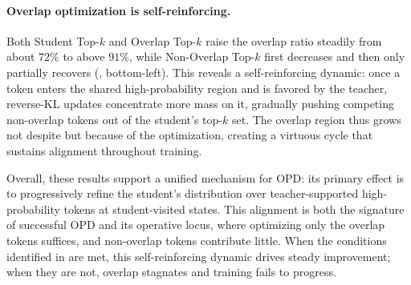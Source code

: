 \paragraph{Overlap optimization is self-reinforcing.}
Both Student Top-$k$ and Overlap Top-$k$ raise the overlap ratio steadily from about $72\%$ to above $91\%$, while Non-Overlap Top-$k$ first decreases and then only partially recovers (, bottom-left).
This reveals a self-reinforcing dynamic: once a token enters the shared high-probability region and is favored by the teacher, reverse-KL updates concentrate more mass on it, gradually pushing competing non-overlap tokens out of the student's top-$k$ set. The overlap region thus grows not despite but because of the optimization, creating a virtuous cycle that sustains alignment throughout training.

Overall, these results support a unified mechanism for OPD: its primary effect is to progressively refine the student's distribution over teacher-supported high-probability tokens at student-visited states.
This alignment is both the signature of successful OPD and its operative locus, where optimizing only the overlap tokens suffices, and non-overlap tokens contribute little.
When the conditions identified in  are met, this self-reinforcing dynamic drives steady improvement; when they are not, overlap stagnates and training fails to progress.









